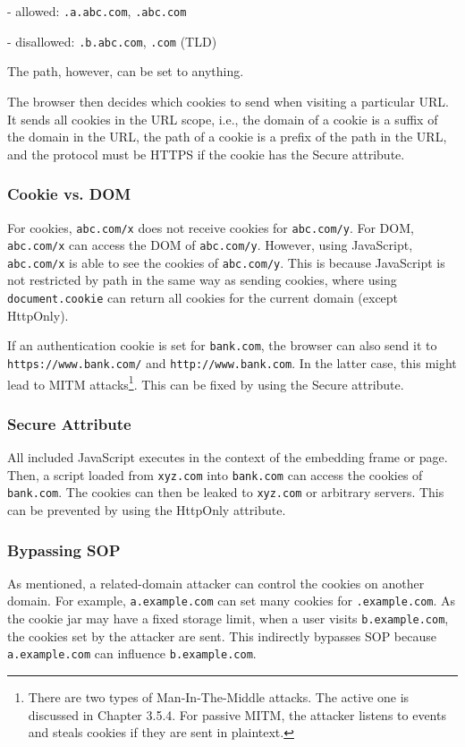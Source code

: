 - allowed: \texttt{.a.abc.com}, \texttt{.abc.com} 

- disallowed: \texttt{.b.abc.com}, \texttt{.com} (TLD) 

The path, however, can be set to anything. 

The browser then decides which cookies to send when visiting a particular URL. It sends all cookies in the URL scope, i.e., the domain of a cookie is a suffix of the domain in the URL, the path of a cookie is a prefix of the path in the URL, and the protocol must be HTTPS if the cookie has the Secure attribute. 

\subsubsection{Cookie vs. DOM}
For cookies, \texttt{abc.com/x} does not receive cookies for \texttt{abc.com/y}. For DOM, \texttt{abc.com/x} can access the DOM of \texttt{abc.com/y}. However, using JavaScript, \texttt{abc.com/x} is able to see the cookies of \texttt{abc.com/y}. This is because JavaScript is not restricted by path in the same way as sending cookies, where using \texttt{document.cookie} can return all cookies for the current domain (except HttpOnly). 

If an authentication cookie is set for \texttt{bank.com}, the browser can also send it to \texttt{https://www.bank.com/} and \texttt{http://www.bank.com}. In the latter case, this might lead to MITM attacks\footnote{There are two types of Man-In-The-Middle attacks. The active one is discussed in Chapter 3.5.4. For passive MITM, the attacker listens to events and steals cookies if they are sent in plaintext.}. This can be fixed by using the Secure attribute. 

\subsubsection{Secure Attribute}
All included JavaScript executes in the context of the embedding frame or page. Then, a script loaded from \texttt{xyz.com} into \texttt{bank.com} can access the cookies of \texttt{bank.com}. The cookies can then be leaked to \texttt{xyz.com} or arbitrary servers. This can be prevented by using the HttpOnly attribute. 

\subsubsection{Bypassing SOP}
As mentioned, a related-domain attacker can control the cookies on another domain. For example, \texttt{a.example.com} can set many cookies for \texttt{.example.com}. As the cookie jar may have a fixed storage limit, when a user visits \texttt{b.example.com}, the cookies set by the attacker are sent. This indirectly bypasses SOP because \texttt{a.example.com} can influence \texttt{b.example.com}. 

